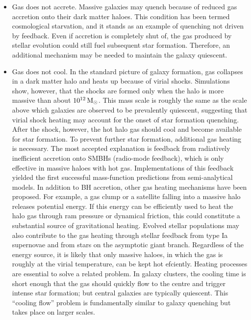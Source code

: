 \documentclass[a4paper,11pt]{article}
\begin{document}
\begin{itemize}
    \item Gas does not accrete. Massive galaxies may quench because of reduced gas accretion onto their dark matter haloes. This condition has been termed cosmological starvation, and it stands as an example of quenching not driven by feedback. Even if accretion is completely shut of, the gas produced by stellar evolution could still fuel subsequent star formation. Therefore, an additional mechanism may be needed to maintain the galaxy quiescent.
    \item Gas does not cool. In the standard picture of galaxy formation, gas collapses in a dark matter halo and heats up because of virial shocks. Simulations show, however, that the shocks are formed only when the halo is more massive than about $10^{12}\,{\rm M_\odot}$. This mass scale is roughly the same as the scale above which galaxies are observed to be prevalently quiescent, suggesting that virial shock heating may account for the onset of star formation quenching. After the shock, however, the hot halo gas should cool and become available for star formation. To prevent further star formation, additional gas heating is necessary. The most accepted explanation is feedback from radiatively inefficient accretion onto SMBHs (radio-mode feedback), which is only effective in massive haloes with hot gas. Implementations of this feedback yielded the first successful mass-function predictions from semi-analytical models. In addition to BH accretion, other gas heating mechanisms have been proposed. For example, a gas clump or a satellite falling into a massive halo releases potential energy. If this energy can be efficiently used to heat the halo gas through ram pressure or dynamical friction, this could constitute a substantial source of gravitational heating. Evolved stellar populations may also contribute to the gas heating through stellar feedback from type Ia supernovae and from stars on the asymptotic giant branch. Regardless of the energy source, it is likely that only massive haloes, in which the gas is roughly at the virial temperature, can be kept hot efciently. Heating processes are essential to solve a related problem. In galaxy clusters, the cooling time is short enough that the gas should quickly flow to the centre and trigger intense star formation; but central galaxies are typically quiescent. This ``cooling flow'' problem is fundamentally similar to galaxy quenching but takes place on larger scales.

\end{itemize}
\end{document}
